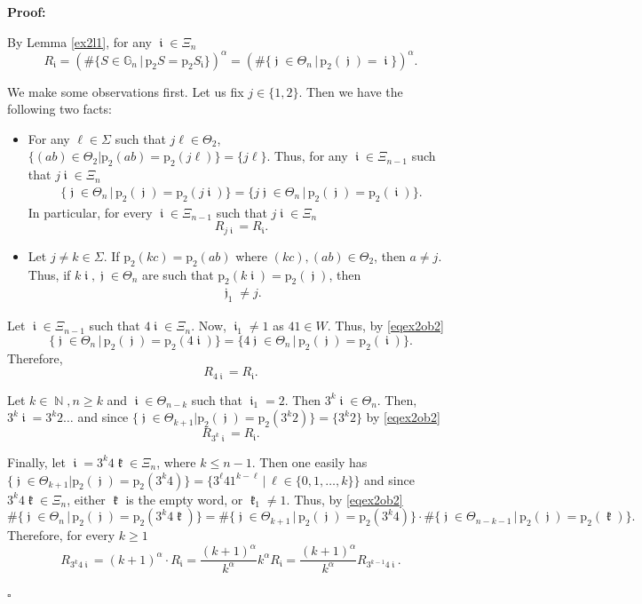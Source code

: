\documentclass[a4paper, 11pt]{article}
\newenvironment{Proof}{\noindent \textbf{Proof:}}{\hfill$\square$\\}
\DeclareMathOperator{\N}{\mathbb{N}}
\DeclareMathOperator{\iii}{\mathfrak{i}}
\DeclareMathOperator{\jjj}{\mathfrak{j}}
\DeclareMathOperator{\kkk}{\mathfrak{k}}
\numberwithin{equation}{section}
\theoremstyle{plain}
\theoremstyle{remark}
\theoremstyle{definition}
\begin{document}
\begin{Proof}

By Lemma \ref{ex2l1}, for any $\iii \in \Xi_n$
\[ R_{\iii} = (\#\{S\in\mathbb{G}_n\, \big|\, \mathrm{p}_{2} S = \mathrm{p}_2 S_{\iii}\})^\alpha = (\#\{\jjj \in \Theta_n\, \big|\, \mathrm{p}_{2}(\jjj) = \iii\})^\alpha. \]

We make some observations first. 
Let us fix $j \in \{1,2\}$. Then we have the following two facts:
\begin{itemize}
\item For any $\ell \in \Sigma$ such that $j\ell \in \Theta_2$, $\{(ab)\in \Theta_2| \mathrm{p}_2(ab) = \mathrm{p}_2(j\ell) \} = \{j\ell\}$. Thus, for any $\iii \in \Xi_{n-1}$ such that $j\iii \in \Xi_n$
\begin{align} \label{eqex2ob1}
\big\{\jjj \in \Theta_{n}\, \big|\, \mathrm{p}_2(\jjj) = \mathrm{p}_2(j\iii)\big\} = \big\{j\jjj \in \Theta_{n}\, \big|\, \mathrm{p}_2(\jjj) = \mathrm{p}_2(\iii)\big\}.
\end{align}
In particular, for every $\iii\in\Xi_{n-1}$ such that $j\iii\in\Xi_n$
\[R_{j\iii} = R_{\iii}.\]
\item Let $j \neq k\in\Sigma$. If $\mathrm{p}_2(kc) = \mathrm{p}_2(ab)$ where $(kc), (ab) \in \Theta_2$, then $a \neq j$. Thus, if $k\iii, \jjj \in \Theta_n$ are such that $\mathrm{p}_2(k\iii) = \mathrm{p}_2(\jjj)$, then
\begin{align}\label{eqex2ob2}
\jjj_1 \neq j.
\end{align}
\end{itemize}

Let $\iii \in \Xi_{n-1}$ such that $4\iii \in \Xi_n$. Now, $\iii_1 \neq 1$ as $41 \in W$. Thus, by \eqref{eqex2ob2}
\[
\big\{\jjj \in \Theta_{n}\, \big|\, \mathrm{p}_2(\jjj) = \mathrm{p}_2(4\iii)\big\} = \big\{4\jjj \in \Theta_{n}\, \big|\, \mathrm{p}_2(\jjj) = \mathrm{p}_2(\iii)\big\}.
\]
Therefore,
\[R_{4\iii} = R_{\iii}.\]

Let $k\in \N, n\geq k$ and $\iii \in \Theta_{n-k}$ such that $\iii_1 = 2$. Then $3^k\iii \in \Theta_n$. Then, $3^k\iii = 3^k2\dots$ and since $\{\jjj \in \Theta_{k+1} | \mathrm{p}_2(\jjj) = \mathrm{p}_2(3^k2)\} = \{3^k2\}$ by \eqref{eqex2ob2}
\[R_{3^k\iii} = R_{\iii}.\]

Finally, let $\iii = 3^k4\kkk \in \Xi_n$, where $k \leq n-1$. Then one easily has $\{\jjj \in \Theta_{k+1}| \mathrm{p}_2(\jjj) = \mathrm{p}_2(3^k4)\} = \big\{3^\ell41^{k-\ell} \, \big|\, \ell \in \{0,1,\dots,k\}\big\}$ and since $3^k4\kkk \in \Xi_n$, either $\kkk$ is the empty word, or $\kkk_1 \neq 1$. Thus, by \eqref{eqex2ob2}
\[
\#\{\jjj \in \Theta_n\, \big|\, \mathrm{p}_{2}(\jjj) = \mathrm{p}_2 (3^k4\kkk)\} = \#\{\jjj \in \Theta_{k+1}\, \big|\, \mathrm{p}_{2}(\jjj) = \mathrm{p}_2 (3^k4)\} \cdot \#\{\jjj \in \Theta_{n-k-1}\, \big|\, \mathrm{p}_{2}(\jjj) = \mathrm{p}_2 (\kkk)\}.
\] 
Therefore, for every $k\geq 1$
\[R_{3^k4\iii} = (k+1)^\alpha \cdot R_{\iii}=\frac{(k+1)^\alpha}{k^\alpha} k^\alpha R_{\iii}=\frac{(k+1)^\alpha}{k^\alpha} R_{3^{k-1}4\iii}.\]



\end{Proof}
\end{document}
